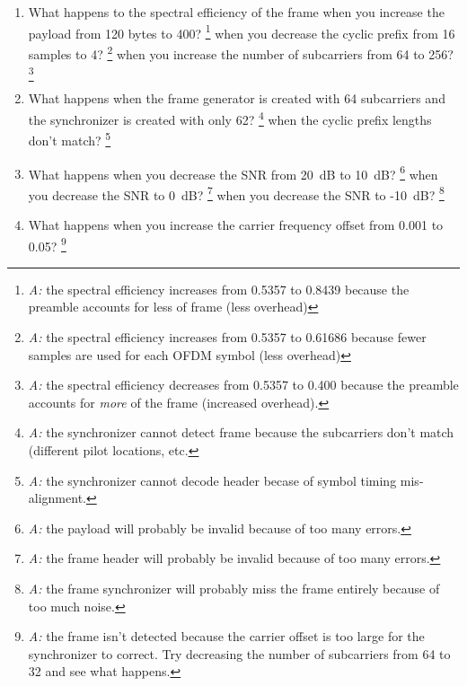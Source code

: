 \begin{enumerate}
\item What happens to the spectral efficiency of the frame when you
      increase the payload from 120 bytes to 400?%
      \footnote{{\em A:} the spectral efficiency increases from 0.5357
                to 0.8439 because the preamble accounts for less of
                frame (less overhead)}
      when you decrease the cyclic prefix from 16 samples to 4?%
      \footnote{{\em A:} the spectral efficiency increases from 0.5357
                to 0.61686 because fewer samples are used for each OFDM
                symbol (less overhead)}
      when you increase the number of subcarriers from 64 to 256?%
      \footnote{{\em A:} the spectral efficiency decreases from 0.5357
                to 0.400 because the preamble accounts for {\em more} of
                the frame (increased overhead).}
\item What happens when the frame generator is created with 64
      subcarriers and the synchronizer is created with only 62?%
      \footnote{{\em A:} the synchronizer cannot detect frame
                because the subcarriers don't match (different pilot
                locations, etc.}
      when the cyclic prefix lengths don't match?%
      \footnote{{\em A:} the synchronizer cannot decode header becase of
                symbol timing  mis-alignment.}
\item What happens when you decrease the SNR from 20~dB to 10~dB?%
      \footnote{{\em A:} the payload will probably be invalid because of
                too many errors.}
      when you decrease the SNR to 0~dB?%
      \footnote{{\em A:} the frame header will probably be invalid
                because of too many errors.}
      when you decrease the SNR to -10~dB?%
      \footnote{{\em A:} the frame synchronizer will probably miss the
                frame entirely because of too much noise.}
\item What happens when you increase the carrier frequency offset from
      0.001 to 0.05?%
      \footnote{{\em A:} the frame isn't detected because the carrier
                offset is too large for the synchronizer to correct.
                Try decreasing the number of subcarriers from 64 to 32
                and see what happens.}
\end{enumerate}


